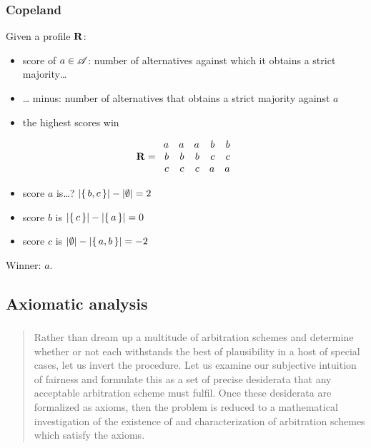\documentclass[french,english]{beamer}
\begin{document}
\begin{frame}
	\frametitle{Copeland}
	Given a profile $\mathbf{R}$:
	\begin{itemize}
		\item score of $a \in \mathscr{A}$: number of alternatives against which it obtains a strict majority…
		\item … minus: number of alternatives that obtains a strict majority against $a$
		\item the highest scores win
	\end{itemize}
	
	
	\begin{equation}
		\mathbf{R} =
		\begin{array}{rrrrr}
			a	&	a	&	a	&	b	&	b\\
			b	&	b	&	b	&	c	&	c\\
			c	&	c	&	c	&	a	&	a
		\end{array}
	\end{equation}
	\begin{itemize}
		\item score $a$ is\dots? \pause $\lvert{\set{b, c}}\rvert - \lvert{\emptyset}\rvert = 2$
		\item score $b$ is $\lvert{\set{c}}\rvert - \lvert{\set{a}}\rvert = 0$
		\item score $c$ is $\lvert{\emptyset}\rvert - \lvert{\set{a, b}}\rvert = -2$
	\end{itemize}
	Winner: $a$.
\end{frame}
	
\subsection{Axiomatic analysis}
\begin{frame}
	\frametitle{\subsecname}
	\begin{quote}
		Rather than dream up a multitude of arbitration schemes and determine whether or not each withstands the best of plausibility in a host of special cases, let us invert the procedure. Let us examine our subjective intuition of fairness and formulate this as a set of precise desiderata that any acceptable arbitration scheme must fulfil. Once these desiderata are formalized as axioms, then the problem is reduced to a mathematical investigation of the existence of and characterization of arbitration schemes which satisfy the axioms.
	\end{quote}
	\citet[p. 121]{luce_games_1957}\par
\end{frame}
\end{document}
